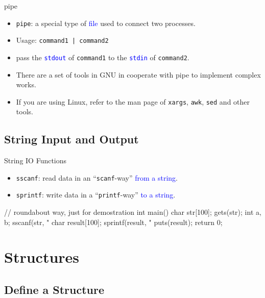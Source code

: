 \documentclass{beamer}
\newcommand{\blue}[1]{\textcolor{blue}{#1}}
\newcommand{\ttt}[1]{\texttt{#1}}
\newcommand{\bluett}[1]{\blue{\ttt{#1}}}
\theoremstyle{definition}
\begin{document}
\begin{frame}[fragile]{pipe}
    \begin{itemize}
        \item \ttt{pipe}: a special type of \blue{file} used to connect two processes.
        \item Usage: \texttt{command1 | command2} 
        \item pass the \bluett{stdout} of \ttt{command1} to the \bluett{stdin} of \ttt{command2}.
        \item There are a set of tools in GNU in cooperate with pipe to implement complex works.
        \item If you are using Linux, refer to the man page of \ttt{xargs}, \ttt{awk}, \ttt{sed} and other tools.
    \end{itemize}
\end{frame}
\subsection{String Input and Output}

\begin{frame}[fragile]{String IO Functions}
    \begin{itemize}
        \item \ttt{sscanf}: read data in an ``\ttt{scanf}-way'' \blue{from a string}.
        \item \ttt{sprintf}: write data in a ``\ttt{printf}-way'' \blue{to a string}.
    \end{itemize}
    \begin{cpp}
// roundabout way, just for demostration
int main() {
  char str[100];
  gets(str);
  int a, b;
  sscanf(str, "%
  char result[100];
  sprintf(result, "%
  puts(result);
  return 0;
}
    \end{cpp}
\end{frame}

\section{Structures}

\subsection{Define a Structure}
\end{document}
